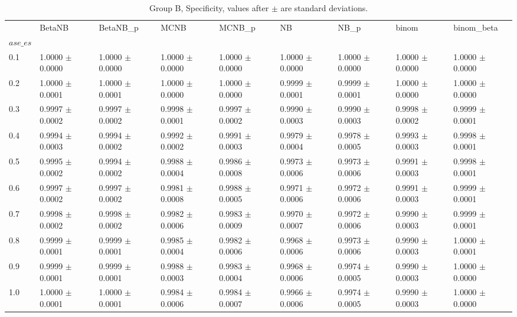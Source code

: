 \begin{table}[H]
\centering
\begin{adjustbox}{max width=\linewidth}
\begin{tabular}{lllllllll}
\toprule
 & BetaNB & BetaNB\_p & MCNB & MCNB\_p & NB & NB\_p & binom & binom\_beta \\
$ase\_es$ &  &  &  &  &  &  &  &  \\
\midrule
0.1 & 1.0000 $\pm$ 0.0000 & 1.0000 $\pm$ 0.0000 & 1.0000 $\pm$ 0.0000 & 1.0000 $\pm$ 0.0000 & 1.0000 $\pm$ 0.0000 & 1.0000 $\pm$ 0.0000 & 1.0000 $\pm$ 0.0000 & 1.0000 $\pm$ 0.0000 \\
0.2 & 1.0000 $\pm$ 0.0001 & 1.0000 $\pm$ 0.0001 & 1.0000 $\pm$ 0.0000 & 1.0000 $\pm$ 0.0000 & 0.9999 $\pm$ 0.0001 & 0.9999 $\pm$ 0.0001 & 1.0000 $\pm$ 0.0000 & 1.0000 $\pm$ 0.0000 \\
0.3 & 0.9997 $\pm$ 0.0002 & 0.9997 $\pm$ 0.0002 & 0.9998 $\pm$ 0.0001 & 0.9997 $\pm$ 0.0002 & 0.9990 $\pm$ 0.0003 & 0.9990 $\pm$ 0.0003 & 0.9998 $\pm$ 0.0002 & 0.9999 $\pm$ 0.0001 \\
0.4 & 0.9994 $\pm$ 0.0003 & 0.9994 $\pm$ 0.0002 & 0.9992 $\pm$ 0.0002 & 0.9991 $\pm$ 0.0003 & 0.9979 $\pm$ 0.0004 & 0.9978 $\pm$ 0.0005 & 0.9993 $\pm$ 0.0003 & 0.9998 $\pm$ 0.0001 \\
0.5 & 0.9995 $\pm$ 0.0002 & 0.9994 $\pm$ 0.0002 & 0.9988 $\pm$ 0.0004 & 0.9986 $\pm$ 0.0008 & 0.9973 $\pm$ 0.0006 & 0.9973 $\pm$ 0.0006 & 0.9991 $\pm$ 0.0003 & 0.9998 $\pm$ 0.0001 \\
0.6 & 0.9997 $\pm$ 0.0002 & 0.9997 $\pm$ 0.0002 & 0.9981 $\pm$ 0.0008 & 0.9988 $\pm$ 0.0005 & 0.9971 $\pm$ 0.0006 & 0.9972 $\pm$ 0.0006 & 0.9991 $\pm$ 0.0003 & 0.9999 $\pm$ 0.0001 \\
0.7 & 0.9998 $\pm$ 0.0002 & 0.9998 $\pm$ 0.0002 & 0.9982 $\pm$ 0.0006 & 0.9983 $\pm$ 0.0009 & 0.9970 $\pm$ 0.0007 & 0.9972 $\pm$ 0.0006 & 0.9990 $\pm$ 0.0003 & 0.9999 $\pm$ 0.0001 \\
0.8 & 0.9999 $\pm$ 0.0001 & 0.9999 $\pm$ 0.0001 & 0.9985 $\pm$ 0.0004 & 0.9982 $\pm$ 0.0006 & 0.9968 $\pm$ 0.0006 & 0.9973 $\pm$ 0.0006 & 0.9990 $\pm$ 0.0003 & 1.0000 $\pm$ 0.0001 \\
0.9 & 0.9999 $\pm$ 0.0001 & 0.9999 $\pm$ 0.0001 & 0.9988 $\pm$ 0.0003 & 0.9983 $\pm$ 0.0004 & 0.9968 $\pm$ 0.0006 & 0.9974 $\pm$ 0.0005 & 0.9990 $\pm$ 0.0003 & 1.0000 $\pm$ 0.0000 \\
1.0 & 1.0000 $\pm$ 0.0001 & 1.0000 $\pm$ 0.0001 & 0.9984 $\pm$ 0.0006 & 0.9984 $\pm$ 0.0007 & 0.9966 $\pm$ 0.0006 & 0.9974 $\pm$ 0.0005 & 0.9990 $\pm$ 0.0003 & 1.0000 $\pm$ 0.0000 \\
\bottomrule
\end{tabular}

\end{adjustbox}
\caption{Group B, Specificity, values after $\pm$ are standard deviations.}
\end{table}

